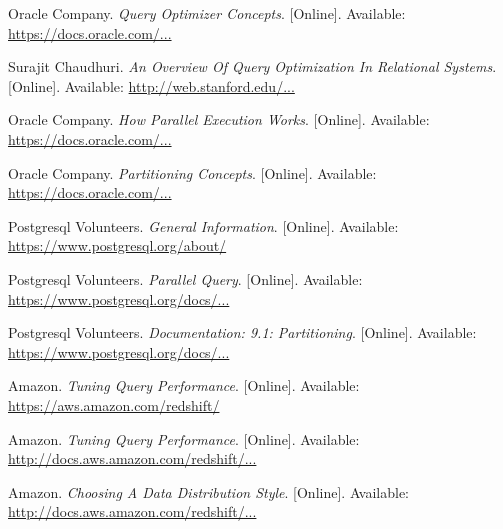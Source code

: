 \documentclass[draftclsnofoot, onecolumn, compsoc, 10pt]{IEEEtran}
\begin{document}
\begin{thebibliography}{9}
Oracle Company.
\textit{Query Optimizer Concepts}.
[Online].
Available: \href{https://docs.oracle.com/database/121/TGSQL/tgsql_optcncpt.htm#TGSQL192}{https://docs.oracle.com/...}
 
Surajit Chaudhuri.
\textit{An Overview Of Query Optimization In Relational Systems}.
[Online].
Available: \href{http://web.stanford.edu/class/cs345d-01/rl/chaudhuri98.pdf}{http://web.stanford.edu/...}

Oracle Company.
\textit{How Parallel Execution Works}.
[Online].
Available: \href{https://docs.oracle.com/cd/E11882_01/server.112/e25523/parallel002.htm}{https://docs.oracle.com/...}

Oracle Company.
\textit{Partitioning Concepts}.
[Online].
Available: \href{https://docs.oracle.com/cd/B28359_01/server.111/b32024/partition.htm}{https://docs.oracle.com/...}

Postgresql Volunteers.
\textit{General Information}.
[Online].
Available: \href{https://www.postgresql.org/about/}{https://www.postgresql.org/about/}

Postgresql Volunteers.
\textit{Parallel Query}.
[Online].
Available: \href{https://www.postgresql.org/docs/current/static/parallel-query.html}{https://www.postgresql.org/docs/...}

Postgresql Volunteers.
\textit{Documentation: 9.1: Partitioning}.
[Online].
Available: \href{https://www.postgresql.org/docs/9.1/static/ddl-partitioning.html}{https://www.postgresql.org/docs/...}

Amazon.
\textit{Tuning Query Performance}.
[Online].
Available: \href{https://aws.amazon.com/redshift/}{https://aws.amazon.com/redshift/}

Amazon.
\textit{Tuning Query Performance}.
[Online].
Available: \href{http://docs.aws.amazon.com/redshift/latest/dg/c-optimizing-query-performance.html}{http://docs.aws.amazon.com/redshift/...}

Amazon.
\textit{Choosing A Data Distribution Style}.
[Online].
Available: \href{http://docs.aws.amazon.com/redshift/latest/dg/t_Distributing_data.html}{http://docs.aws.amazon.com/redshift/...}


\end{thebibliography}
\end{document}
